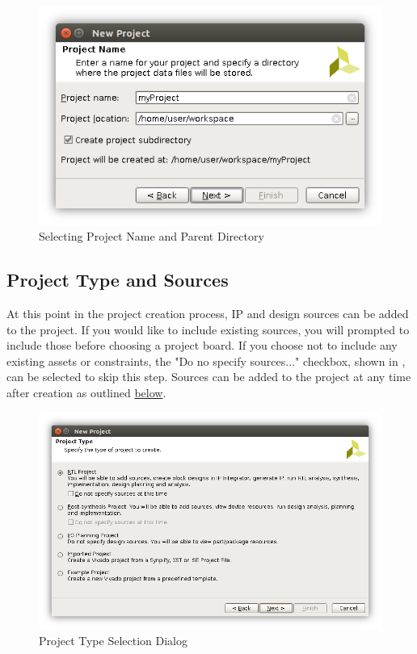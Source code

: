 \begin{figure}
	\centering
	\includegraphics{images/New_Project}
	\caption{Selecting Project Name and Parent Directory}
	\label{fig:vivadonewprojectname}
\end{figure}

\subsection{Project Type and Sources}
At this point in the project creation process, IP and design sources can be added to the project. If you would like to include existing sources, you will prompted to include those before choosing a project board. If you choose not to include any existing assets or constraints, the "Do no specify sources..." checkbox, shown in , can be selected to skip this step. Sources can be added to the project at any time after creation as outlined \hyperref[sub:addsources]{below}.\\

\begin{figure}
	\centering
	\includegraphics{images/New_Project_Type.png}
	\caption{Project Type Selection Dialog}
	\label{fig:newprojecttype}
\end{figure}


